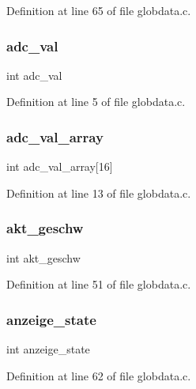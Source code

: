 Definition at line 65 of file globdata.\+c.

\mbox{\label{globdata_8h_a6ba1c07c85c0ae4540e705263660ad15}} 
\subsubsection{adc\+\_\+val}
{\footnotesize\ttfamily int adc\+\_\+val}



Definition at line 5 of file globdata.\+c.

\mbox{\label{globdata_8h_af262c6b36a43d81270912c79810a0ac0}} 
\subsubsection{adc\+\_\+val\+\_\+array}
{\footnotesize\ttfamily int adc\+\_\+val\+\_\+array[16]}



Definition at line 13 of file globdata.\+c.

\mbox{\label{globdata_8h_a602c60443c28b2a86f8c55ba2049e39c}} 
\subsubsection{akt\+\_\+geschw}
{\footnotesize\ttfamily int akt\+\_\+geschw}



Definition at line 51 of file globdata.\+c.

\mbox{\label{globdata_8h_a3f5a2d86d789bedb9ac8444e7d7a5dce}} 
\subsubsection{anzeige\+\_\+state}
{\footnotesize\ttfamily int anzeige\+\_\+state}



Definition at line 62 of file globdata.\+c.

\mbox{\label{globdata_8h_a163ea70feb573ebd563d1e4e7f9caef5}} 
